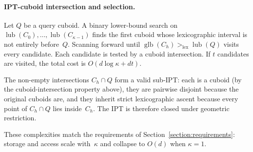 \documentclass[manuscript,screen,review]{acmart}
\theoremstyle{definition}
\theoremstyle{plain}
\begin{document}
\paragraph{IPT-cuboid intersection and selection.}
Let $Q$ be a query cuboid. A binary lower-bound search on $\operatorname{lub}(C_0),\ldots,\operatorname{lub}(C_{\kappa-1})$ finds the first cuboid whose lexicographic interval is not entirely before~$Q$. Scanning forward until $\operatorname{glb}(C_h) >_{\mathrm{lex}} \operatorname{lub}(Q)$ visits every candidate. Each candidate is tested by a cuboid intersection. If $t$ candidates are visited, the total cost is $O(d\log \kappa + dt)$.

The non-empty intersections $C_h \cap Q$ form a valid sub-IPT: each is a cuboid (by the cuboid-intersection property above), they are pairwise disjoint because the original cuboids are, and they inherit strict lexicographic ascent because every point of $C_h \cap Q$ lies inside~$C_h$. The IPT is therefore closed under geometric restriction.

These complexities match the requirements of Section~\ref{section:requirements}: storage and access scale with~$\kappa$ and collapse to $O(d)$ when $\kappa=1$.
\end{document}
